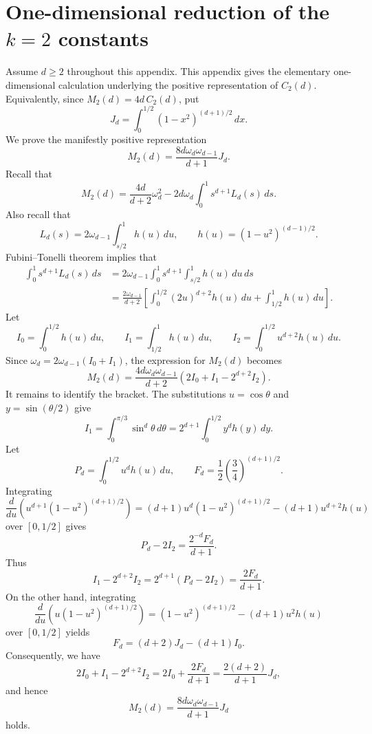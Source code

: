 \documentclass[11pt]{article}
\theoremstyle{remark}
\numberwithin{equation}{section}
\begin{document}
\section{One-dimensional reduction of the \texorpdfstring{$k=2$}{k=2} constants}
\label{app:k2-one-dimensional}
Assume \(d\ge2\) throughout this appendix.
This appendix gives the elementary one-dimensional calculation underlying
the positive representation of \(C_2(d)\).
Equivalently, since \(M_2(d)=4d\,C_2(d)\), put
\[
J_d=\int_0^{1/2}(1-x^2)^{(d+1)/2}\,dx.
\]
We prove the manifestly positive representation
\[
M_2(d)=\frac{8d\omega_d\omega_{d-1}}{d+1}J_d.
\]
Recall that
\[
M_2(d)
=
\frac{4d}{d+2}\omega_d^2
-
2d\omega_d
\int_0^1 s^{d+1}L_d(s)\,ds.
\]
Also recall that
\[
L_d(s)=2\omega_{d-1}\int_{s/2}^{1}h(u)\,du,
\qquad h(u)=(1-u^2)^{(d-1)/2}.
\]
Fubini--Tonelli theorem implies that
\[
\begin{aligned}
\int_0^1s^{d+1}L_d(s)\,ds
&=2\omega_{d-1}\int_0^1s^{d+1}\int_{s/2}^{1}h(u)\,du\,ds \\
&=\frac{2\omega_{d-1}}{d+2}
\left[\int_0^{1/2}(2u)^{d+2}h(u)\,du+
\int_{1/2}^{1}h(u)\,du\right].
\end{aligned}
\]
Let
\[
I_0=\int_0^{1/2}h(u)\,du,
\qquad I_1=\int_{1/2}^{1}h(u)\,du,
\qquad I_2=\int_0^{1/2}u^{d+2}h(u)\,du.
\]
Since $\omega_d=2\omega_{d-1}(I_0+I_1)$, the expression for $M_2(d)$ becomes
\[
M_2(d)=\frac{4d\omega_d\omega_{d-1}}{d+2}
\left(2I_0+I_1-2^{d+2}I_2\right).
\]
It remains to identify the bracket.  The substitutions $u=\cos\theta$ and
$y=\sin(\theta/2)$ give
\[
I_1=\int_0^{\pi/3}\sin^d\theta\,d\theta
=2^{d+1}\int_0^{1/2}y^d h(y)\,dy.
\]
Let
\[
P_d=\int_0^{1/2}u^dh(u)\,du,
\qquad
F_d=\frac12\left(\frac34\right)^{(d+1)/2}.
\]
Integrating
\[
\frac{d}{du}\left(u^{d+1}(1-u^2)^{(d+1)/2}\right)
=(d+1)u^d(1-u^2)^{(d+1)/2}-(d+1)u^{d+2}h(u)
\]
over $[0,1/2]$ gives
\[
P_d-2I_2=\frac{2^{-d}F_d}{d+1}.
\]
Thus
\[
I_1-2^{d+2}I_2=2^{d+1}(P_d-2I_2)=\frac{2F_d}{d+1}.
\]
On the other hand, integrating
\[
\frac{d}{du}\left(u(1-u^2)^{(d+1)/2}\right)
=(1-u^2)^{(d+1)/2}-(d+1)u^2h(u)
\]
over $[0,1/2]$ yields
\[
F_d=(d+2)J_d-(d+1)I_0.
\]
Consequently, we have
\[
2I_0+I_1-2^{d+2}I_2
=2I_0+\frac{2F_d}{d+1}
=\frac{2(d+2)}{d+1}J_d,
\]
and hence
\[
M_2(d)=\frac{8d\omega_d\omega_{d-1}}{d+1}J_d
\]
holds.
\end{document}
